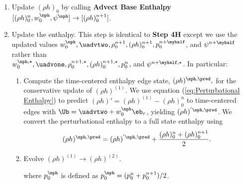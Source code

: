 \begin{description}
\begin{enumerate}
\item Update $(\rho h)_0$ by calling 
{\bf Advect Base Enthalpy}$[(\rho h)_0^n, w_0^{\nph}, \psi^{\nph}] \rightarrow [(\rho h)_0^{n+1}]$.

\item Update the enthalpy.  This step is identical to {\bf Step 4H} except we use
  the updated values $w_0^{\nph}, \uadvtwo, \rho_0^{n+1}, (\rho h)_0^{n+1}, p_0^{n+\myhalf}$, 
  and $\psi^{n+\myhalf}$ rather than\\
  $w_0^{\nph,\star}, \uadvone, \rho_0^{n+1,\star}, (\rho h)_0^{n+1,\star}, p_0^n$, 
  and $\psi^{n+\myhalf,\star}$.  In particular:

\begin{enumerate}
\renewcommand{\labelenumii}{{\bf \roman{enumii}}.}

\item Compute the time-centered enthalpy edge state, $(\rho h)^{\nph,\pred},$
  for the conservative update of $(\rho h)^{(1)}$.  We use equation 
  (\ref{eq:Perturbational Enthalpy}) to predict
  $(\rho h)' = (\rho h)^{(1)} - (\rho h)_0^n$ to time-centered edges
  with $\Ub = \uadvtwo+w_0^{\nph} \eb_r$,
  yielding $(\rho h)^{'\nph,\pred}$.  
  We convert the perturbational enthalpy to a full state enthalpy using
\begin{equation}
(\rho h)^{\nph,\pred} = (\rho h)^{'\nph,\pred} + \frac{(\rho h)_0^n + (\rho h)_0^{n+1}}{2}.
\end{equation}

\item Evolve $(\rho h)^{(1)} \rightarrow (\rho h)^{(2)}$.
where $p_0^\nph$ is defined as $p_0^\nph = (p_0^n+p_0^{n+1})/2$.


\end{enumerate}
\end{enumerate}
\end{description}
